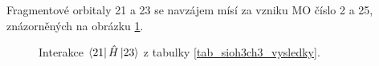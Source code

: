 \documentclass[
  digital, %
  table,   %
  lof,     %
  lot,     %
]{fithesis3}
\begin{document}
Fragmentové orbitaly  21 a 23 se navzájem mísí za vzniku MO číslo 2 a 25, znázorněných na obrázku \ref{obr_sioh3ch3_vysledky_III}.   
\begin{figure}
\begin{center}
\caption{Interakce $\bra{21}{\hat{H}}\ket{23}$  z tabulky \ref{tab_sioh3ch3_vysledky}.}

\label{obr_sioh3ch3_vysledky_III}\end{center}
\end{figure} 
   
\end{document}
